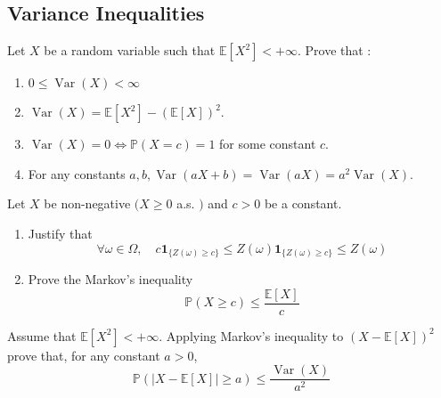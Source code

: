 \begin{center}
    \section*{Variance Inequalities}
\end{center}

\begin{Exercise}
    Let $X$ be a random variable such that $\mathbb{E}\left[X^2\right]<+\infty$. Prove that :
    \begin{enumerate}
        \item $0 \leq \operatorname{Var}(X)<\infty$
        \item $\operatorname{Var}(X)=\mathbb{E}\left[X^2\right]-(\mathbb{E}[X])^2$.
        \item $\operatorname{Var}(X)=0 \Longleftrightarrow \mathbb{P}(X=c)=1$ for some constant $c$.
        \item For any constants $a, b, \operatorname{Var}(a X+b)=\operatorname{Var}(a X)=a^2 \operatorname{Var}(X)$.
    \end{enumerate}
\end{Exercise}

\begin{Exercise}
    Let $X$ be non-negative $(X \geq 0$ a.s. $)$ and $c>0$ be a constant.
    \begin{enumerate}
        \item Justify that
              $$\forall \omega \in \Omega, \quad c \mathbf{1}_{\{Z(\omega) \geqslant c\}} \leqslant Z(\omega) \mathbf{1}_{\{Z(\omega) \geqslant c\}} \leqslant Z(\omega)$$
        \item Prove the Markov's inequality
              $$
                  \mathbb{P}(X \geq c) \leq \frac{\mathbb{E}[X]}{c}
              $$
    \end{enumerate}
\end{Exercise}

\begin{Exercise}
    Assume that $\mathbb{E}\left[X^2\right]<+\infty$. Applying Markov's inequality to $(X-\mathbb{E}[X])^2$ prove that, for any constant $a>0$,
    $$
        \mathbb{P}(|X-\mathbb{E}[X]| \geq a) \leq \frac{\operatorname{Var}(X)}{a^2}
    $$
\end{Exercise}